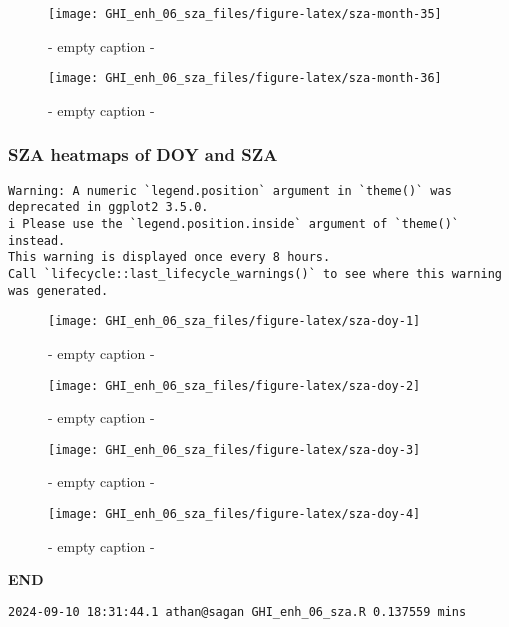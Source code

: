 \documentclass[
  10pt,
  a4paper,oneside]{article}
\begin{document}
\begin{figure}[H]

{\centering \texttt{[image: GHI\_enh\_06\_sza\_files/figure-latex/sza-month-35]} 

}

\caption{ - empty caption - }\label{fig:sza-month-35}
\end{figure}
\begin{figure}[H]

{\centering \texttt{[image: GHI\_enh\_06\_sza\_files/figure-latex/sza-month-36]} 

}

\caption{ - empty caption - }\label{fig:sza-month-36}
\end{figure}

\newpage
\FloatBarrier

\hypertarget{sza-heatmaps-of-doy-and-sza}{%
\subsubsection{SZA heatmaps of DOY and SZA}\label{sza-heatmaps-of-doy-and-sza}}

\begin{verbatim}
Warning: A numeric `legend.position` argument in `theme()` was deprecated in ggplot2 3.5.0.
i Please use the `legend.position.inside` argument of `theme()` instead.
This warning is displayed once every 8 hours.
Call `lifecycle::last_lifecycle_warnings()` to see where this warning was generated.
\end{verbatim}

\begin{figure}[H]

{\centering \texttt{[image: GHI\_enh\_06\_sza\_files/figure-latex/sza-doy-1]} 

}

\caption{ - empty caption - }\label{fig:sza-doy-1}
\end{figure}
\begin{figure}[H]

{\centering \texttt{[image: GHI\_enh\_06\_sza\_files/figure-latex/sza-doy-2]} 

}

\caption{ - empty caption - }\label{fig:sza-doy-2}
\end{figure}
\begin{figure}[H]

{\centering \texttt{[image: GHI\_enh\_06\_sza\_files/figure-latex/sza-doy-3]} 

}

\caption{ - empty caption - }\label{fig:sza-doy-3}
\end{figure}
\begin{figure}[H]

{\centering \texttt{[image: GHI\_enh\_06\_sza\_files/figure-latex/sza-doy-4]} 

}

\caption{ - empty caption - }\label{fig:sza-doy-4}
\end{figure}

\textbf{END}

\begin{verbatim}
2024-09-10 18:31:44.1 athan@sagan GHI_enh_06_sza.R 0.137559 mins
\end{verbatim}
\end{document}
